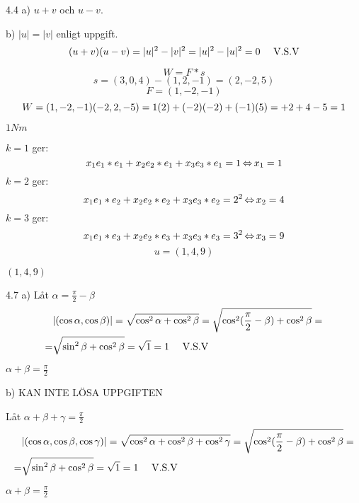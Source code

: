 \begin{task}{4.4 a)}
	$u+v$ och $u-v$.
\end{task}

\begin{task}{b)}
	$|u|=|v|$ enligt uppgift.
	\[(u+v)\*(u-v)=|u|^2-|v|^2=|u|^2-|u|^2=0 \mproof\]
\end{task}

\begin{task}{4.5}
	\[W=F*s\]
	\[s=(3,0,4)-(1,2,-1)=(2,-2,5)\]
	\[F=(1,-2,-1)\]
	\[W=(1,-2,-1)\*(-2,2,-5)=
	1\*(2)+(-2)\*(-2)+(-1)\*(5)=+2+4-5=1\]

	\ans $1Nm$
\end{task}

\begin{task}{4.6}
	$k=1$ ger:
	\[x_1e_1*e_1+x_2e_2*e_1+x_3e_3*e_1=1 \operatorname{\Leftrightarrow}
	x_1=1\]
	$k=2$ ger:
	\[x_1e_1*e_2+x_2e_2*e_2+x_3e_3*e_2=2^2 \operatorname{\Leftrightarrow}
	x_2=4\]
	$k=3$ ger:
	\[x_1e_1*e_3+x_2e_2*e_3+x_3e_3*e_3=3^2 \operatorname{\Leftrightarrow}
	x_3=9\]
	\[u=(1,4,9)\]

	\ans $(1,4,9)$
\end{task}

\begin{task}{4.7 a)}
	Låt $\alpha=\frac{\pi}{2}-\beta$
	\begin{align*}
		&|(\cos\alpha,\cos\beta)|=
		\sqrt{\cos^2\alpha+\cos^2\beta}=
		\sqrt{\cos^2(\frac{\pi}{2}-\beta)+\cos^2\beta}= \\ =
		&\sqrt{\sin^2\beta+\cos^2\beta}=
		\sqrt{1}=1 \text{~~~~V.S.V}
	\end{align*}
	
	\ans $\alpha+\beta=\frac{\pi}{2}$
\end{task}

\begin{task}{b)}
	KAN INTE LÖSA UPPGIFTEN
	
	Låt $\alpha+\beta+\gamma=\frac{\pi}{2}$
	\begin{align*}
		&|(\cos\alpha,\cos\beta,\cos\gamma)|=
		\sqrt{\cos^2\alpha+\cos^2\beta+\cos^2\gamma}=
		\sqrt{\cos^2(\frac{\pi}{2}-\beta)+\cos^2\beta}= \\ =
		&\sqrt{\sin^2\beta+\cos^2\beta}=
		\sqrt{1}=1 \text{~~~~V.S.V}
	\end{align*}

	\ans $\alpha+\beta=\frac{\pi}{2}$
\end{task}

